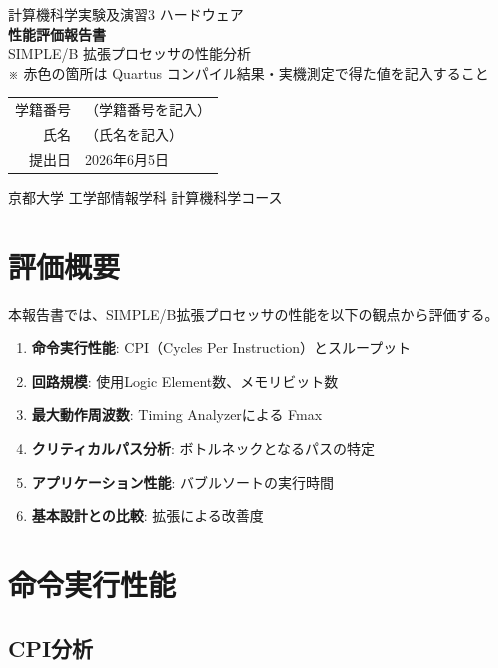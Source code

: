 \documentclass[a4paper,11pt]{ltjsarticle}
\begin{document}
\begin{titlepage}
\centering
\vspace*{3cm}
{\LARGE 計算機科学実験及演習3 ハードウェア}\\[1cm]
{\Huge\bfseries 性能評価報告書}\\[0.5cm]
{\LARGE SIMPLE/B 拡張プロセッサの性能分析}\\[2cm]
{\large\color{red} ※ 赤色の箇所は Quartus コンパイル結果・実機測定で得た値を記入すること}\\[2cm]
\begin{tabular}{rl}
学籍番号 & （学籍番号を記入） \\[0.5em]
氏名     & （氏名を記入） \\[0.5em]
提出日   & 2026年6月5日 \\
\end{tabular}
\vfill
京都大学 工学部情報学科 計算機科学コース
\end{titlepage}

\tableofcontents
\clearpage


\section{評価概要}

本報告書では、SIMPLE/B拡張プロセッサの性能を以下の観点から評価する。

\begin{enumerate}
\item \textbf{命令実行性能}: CPI（Cycles Per Instruction）とスループット
\item \textbf{回路規模}: 使用Logic Element数、メモリビット数
\item \textbf{最大動作周波数}: Timing Analyzerによる Fmax
\item \textbf{クリティカルパス分析}: ボトルネックとなるパスの特定
\item \textbf{アプリケーション性能}: バブルソートの実行時間
\item \textbf{基本設計との比較}: 拡張による改善度
\end{enumerate}


\section{命令実行性能}

\subsection{CPI分析}
\end{document}

